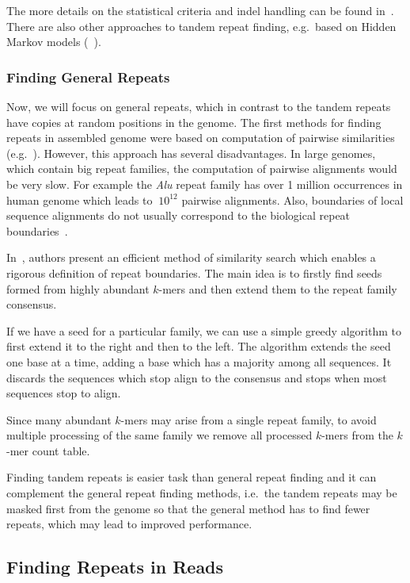 The more details on the statistical criteria and indel handling can be found in~\cite{trf}. There are also other approaches to tandem repeat finding, e.g.\ based on Hidden Markov models (~\cite{tantan, nanasi2014probabilistic}).

\subsubsection{Finding General Repeats}

Now, we will focus on general repeats, which in contrast to the tandem repeats have copies at random positions in the genome.
The first methods for finding repeats in assembled genome were based on computation of pairwise similarities (e.g.~\cite{reputer, repeatfinder, recon, repeatgluer, piler}). However, this approach has several disadvantages. In large genomes, which contain big repeat families, the computation of pairwise alignments would be very slow. For example the \textit{Alu} repeat family has over 1 million occurrences in human genome which leads to $~10^{12}$ pairwise alignments.
Also, boundaries of local sequence alignments do not usually correspond to the biological repeat boundaries~\cite{recon}.

In~\cite{repscout}, authors present an efficient method of similarity search which enables a rigorous definition of repeat boundaries. The main idea is to firstly find seeds formed from highly abundant $k$-mers and then extend them to the repeat family consensus.

If we have a seed for a particular family, we can use a simple greedy algorithm to first extend it to the right and then to the left. The algorithm extends the seed one base at a time, adding a base which has a majority among all sequences. It discards the sequences which stop align to the consensus and stops when most sequences stop to align.

Since many abundant $k$-mers may arise from a single repeat family, to avoid multiple processing of the same family we remove all processed $k$-mers from the $k$-mer count table.

Finding tandem repeats is easier task than general repeat finding and it can complement the general repeat finding methods, i.e.\ the tandem repeats may be masked first from the genome so that the general method has to find fewer repeats, which may lead to improved performance.

\subsection{Finding Repeats in Reads}\label{sect:repeats-reads}

